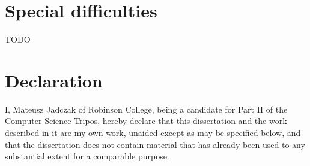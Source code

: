 \section*{Special difficulties}

TODO
\newpage
\section*{Declaration}

I, Mateusz Jadczak of Robinson College, being a candidate for Part II of the Computer
Science Tripos, hereby declare
that this dissertation and the work described in it are my own work,
unaided except as may be specified below, and that the dissertation
does not contain material that has already been used to any substantial
extent for a comparable purpose.

\bigskip
{}

\medskip
{}





